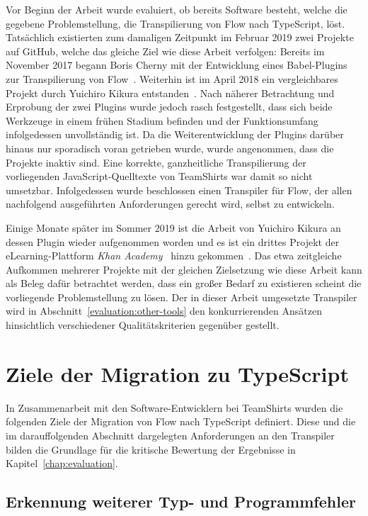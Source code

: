 Vor Beginn der Arbeit wurde evaluiert, ob bereits Software besteht, welche die gegebene Problemstellung, die Transpilierung von Flow nach TypeScript, löst. Tatsächlich existierten zum damaligen Zeitpunkt im Februar 2019 zwei Projekte auf GitHub, welche das gleiche Ziel wie diese Arbeit verfolgen: Bereits im November 2017 begann Boris Cherny mit der Entwicklung eines Babel-Plugins zur Transpilierung von Flow~\autocite{CHERNY:FLOW_TO_TS}. Weiterhin ist im April 2018 ein vergleichbares Projekt durch Yuichiro Kikura entstanden~\autocite{KIKURA:FLOW_TO_TS}. Nach näherer Betrachtung und Erprobung der zwei Plugins wurde jedoch rasch festgestellt, dass sich beide Werkzeuge in einem frühen Stadium befinden und der Funktionsumfang infolgedessen unvollständig ist. Da die Weiterentwicklung der Plugins darüber hinaus nur sporadisch voran getrieben wurde, wurde angenommen, dass die Projekte inaktiv sind. Eine korrekte, ganzheitliche Transpilierung der vorliegenden JavaScript-Quelltexte von TeamShirts war damit so nicht umsetzbar. Infolgedessen wurde beschlossen einen Transpiler für Flow, der allen nachfolgend ausgeführten Anforderungen gerecht wird, selbst zu entwickeln.

Einige Monate später im Sommer 2019 ist die Arbeit von Yuichiro Kikura an dessen Plugin wieder aufgenommen worden und es ist ein drittes Projekt der eLearning-Plattform \textit{Khan Academy}~\autocite{KHAN_ACADEMY} hinzu gekommen~\autocite{KHAN:FLOW_TO_TS}. Das etwa zeitgleiche Aufkommen mehrerer Projekte mit der gleichen Zielsetzung wie diese Arbeit kann als Beleg dafür betrachtet werden, dass ein großer Bedarf zu existieren scheint die vorliegende Problemstellung zu lösen. Der in dieser Arbeit umgesetzte Transpiler wird in Abschnitt~\ref{evaluation:other-tools} den konkurrierenden Ansätzen hinsichtlich verschiedener Qualitätskriterien gegenüber gestellt.

\section{Ziele der Migration zu TypeScript}
\label{analysis:goals}

In Zusammenarbeit mit den Software-Entwicklern bei TeamShirts wurden die folgenden Ziele der Migration von Flow nach TypeScript definiert. Diese und die im darauffolgenden Abschnitt dargelegten Anforderungen an den Transpiler bilden die Grundlage für die kritische Bewertung der Ergebnisse in Kapitel~\ref{chap:evaluation}.

\subsection{Erkennung weiterer Typ- und Programmfehler}

